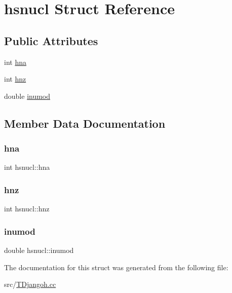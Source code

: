 \hypertarget{structhsnucl}{}\section{hsnucl Struct Reference}
\label{structhsnucl}
\subsection*{Public Attributes}
\begin{DoxyCompactItemize}
\item 
int \hyperlink{structhsnucl_a0b7428a63f3754ecae1e8d5608c85926}{hna}
\item 
int \hyperlink{structhsnucl_a44cfd49347cfa9277201436c3a7801d2}{hnz}
\item 
double \hyperlink{structhsnucl_aaed1653c38a1e8e49bcdbb1e84aa1cd8}{inumod}
\end{DoxyCompactItemize}


\subsection{Member Data Documentation}
\mbox{\label{structhsnucl_a0b7428a63f3754ecae1e8d5608c85926}} 
\subsubsection{\texorpdfstring{hna}{hna}}
{\footnotesize\ttfamily int hsnucl\+::hna}

\mbox{\label{structhsnucl_a44cfd49347cfa9277201436c3a7801d2}} 
\subsubsection{\texorpdfstring{hnz}{hnz}}
{\footnotesize\ttfamily int hsnucl\+::hnz}

\mbox{\label{structhsnucl_aaed1653c38a1e8e49bcdbb1e84aa1cd8}} 
\subsubsection{\texorpdfstring{inumod}{inumod}}
{\footnotesize\ttfamily double hsnucl\+::inumod}



The documentation for this struct was generated from the following file\+:\begin{DoxyCompactItemize}
\item 
src/\hyperlink{_t_djangoh_8cc}{T\+Djangoh.\+cc}\end{DoxyCompactItemize}
